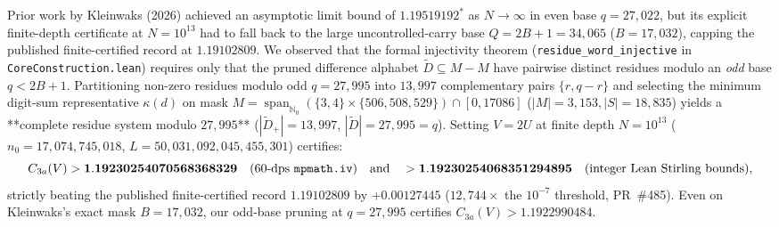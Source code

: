 \documentclass[11pt,a4paper]{article}
\begin{document}
Prior work by Kleinwaks (2026) achieved an asymptotic limit bound of $1.19519192^*$ as $N \to \infty$ in even base $q = 27{,}022$, but its explicit finite-depth certificate at $N = 10^{13}$ had to fall back to the large uncontrolled-carry base $Q = 2B + 1 = 34{,}065$ ($B = 17{,}032$), capping the published finite-certified record at $\mathbf{1.19102809}$. We observed that the formal injectivity theorem (\texttt{residue\_word\_injective} in \texttt{CoreConstruction.lean}) requires only that the pruned difference alphabet $\widetilde{D} \subseteq M - M$ have pairwise distinct residues modulo an \emph{odd} base $q < 2B + 1$. Partitioning non-zero residues modulo odd $q = 27{,}995$ into $13{,}997$ complementary pairs $\{r, q-r\}$ and selecting the minimum digit-sum representative $\kappa(d)$ on mask $M = \operatorname{span}_{\mathbb{N}_0}(\{3,4\}\times\{506,508,529\}) \cap [0, 17086]$ ($|M|=3{,}153, |S|=18{,}835$) yields a **complete residue system modulo $27{,}995$** ($|\widetilde{D}_+| = 13{,}997$, $|\widetilde{D}| = 27{,}995 = q$). Setting $V = 2U$ at finite depth $N = 10^{13}$ ($n_0 = 17{,}074{,}745{,}018$, $L = 50{,}031{,}092{,}045{,}455{,}301$) certifies:
$$C_{3a}(V) > \mathbf{1.19230254070568368329} \quad (\text{60-dps \texttt{mpmath.iv}}) \quad \text{and} \quad > \mathbf{1.19230254068351294895} \quad (\text{integer Lean Stirling bounds}),$$
strictly beating the published finite-certified record $1.19102809$ by $\mathbf{+0.00127445}$ ($12{,}744\times$ the $10^{-7}$ threshold, PR~\#485). Even on Kleinwaks's exact mask $B = 17{,}032$, our odd-base pruning at $q = 27{,}995$ certifies $C_{3a}(V) > \mathbf{1.1922990484}$.
\end{document}
